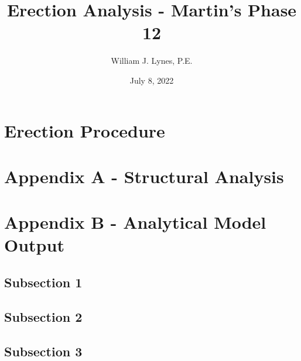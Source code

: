 \documentclass[11pt,letterpaper]{article}
\title{Erection Analysis - Martin's Phase 12}
\author{William J. Lynes, P.E.}
\date{July 8, 2022}
\begin{document}
% 
\setcounter{page}{1}
\tableofcontents

\newpage

\newcommand\zzz[1]{%
\clearpage
\vspace*{\fill}
{\centering\fontfamily{cmss}\selectfont\fontsize{24pt}{24pt}\bfseries#1\par}
\vspace*{\fill}
\clearpage}
\titleformat{\section}{\zzz}{\thesection}{1em}{}


\newcommand\yyy[1]{%
\clearpage
\vspace*{\fill}
{\centering\fontfamily{cmss}\selectfont\fontsize{18pt}{18pt}\bfseries#1\par}
\vspace*{\fill}
\clearpage}
\titleformat{\subsection}{\yyy}{\thesection}{1em}{}

\newcommand\aaa[1]{%
\clearpage
\vspace*{\fill}
{\centering\fontfamily{cmss}\selectfont\fontsize{14pt}{14pt}\bfseries#1\par}
\vspace*{\fill}
\clearpage}
\titleformat{\subsubsection}{\aaa}{\thesection}{1em}{}


\setcounter{page}{1}
\renewcommand{\thepage}{\arabic{page}}


% 
\section{Erection Procedure}



\setcounter{page}{1}
\renewcommand{\thepage}{A-\arabic{page}}
\section{Appendix A - Structural Analysis}


\setcounter{page}{1}
\renewcommand{\thepage}{B-\arabic{page}}
\section{Appendix B - Analytical Model Output}
\subsection{Subsection 1}


\subsection{Subsection 2}


\subsection{Subsection 3}
\end{document}
